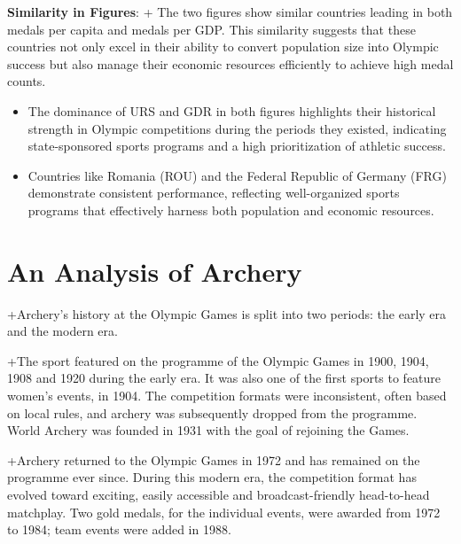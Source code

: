 \documentclass[
  12pt,
]{elsarticle}
\begin{document}
\textbf{Similarity in Figures}: + The two figures show similar countries
leading in both medals per capita and medals per GDP. This similarity
suggests that these countries not only excel in their ability to convert
population size into Olympic success but also manage their economic
resources efficiently to achieve high medal counts.

\begin{itemize}
\item
  The dominance of URS and GDR in both figures highlights their
  historical strength in Olympic competitions during the periods they
  existed, indicating state-sponsored sports programs and a high
  prioritization of athletic success.
\item
  Countries like Romania (ROU) and the Federal Republic of Germany (FRG)
  demonstrate consistent performance, reflecting well-organized sports
  programs that effectively harness both population and economic
  resources.
\end{itemize}

\hypertarget{an-analysis-of-archery}{%
\section{An Analysis of Archery}\label{an-analysis-of-archery}}

+Archery's history at the Olympic Games is split into two periods: the
early era and the modern era.

+The sport featured on the programme of the Olympic Games in 1900, 1904,
1908 and 1920 during the early era. It was also one of the first sports
to feature women's events, in 1904. The competition formats were
inconsistent, often based on local rules, and archery was subsequently
dropped from the programme. World Archery was founded in 1931 with the
goal of rejoining the Games.

+Archery returned to the Olympic Games in 1972 and has remained on the
programme ever since. During this modern era, the competition format has
evolved toward exciting, easily accessible and broadcast-friendly
head-to-head matchplay. Two gold medals, for the individual events, were
awarded from 1972 to 1984; team events were added in 1988.
\end{document}
